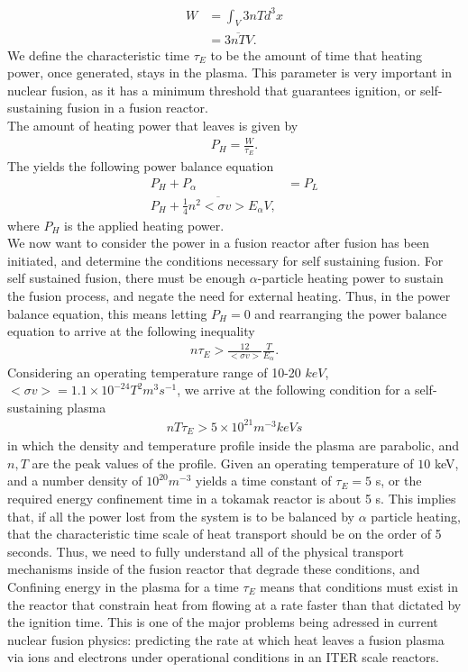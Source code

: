 \documentclass{article}
\begin{document}
\begin{align*}
W &= \int_{V}3nTd^3x\\
    &=3\overline{nT}V.
\end{align*}
We define the characteristic time $\tau_E$ to be the amount of time that heating power, once generated, stays in the plasma. This parameter is very important in nuclear fusion, as it has a minimum threshold that guarantees ignition, or self-sustaining fusion in a fusion reactor.\\ The amount of heating power that leaves is given by 
\begin{align*}
P_H = \frac{W}{\tau_E}.
\end{align*}
The yields the following power balance equation
\begin{align*}
P_H + P_{\alpha} &= P_L\\
P_H + \frac{1}{4}\overline{n^2 <\sigma v>}E_{\alpha} V,
\end{align*}
where $P_H$ is the applied heating power.\\
We now want to consider the power in a fusion reactor after fusion has been initiated, and determine the conditions necessary for self sustaining fusion. For self sustained fusion,  there must be enough $\alpha$-particle heating power to sustain the fusion process, and negate the need for external heating. Thus, in the power balance equation, this means letting $P_H =0$ and rearranging the power balance equation to arrive at the following inequality
\begin{align*}
n\tau_E > \frac{12}{<\sigma v>}\frac{T}{E_\alpha}. 
\end{align*}
Considering an operating temperature range of 10-20 $keV$, $<\sigma v> = 1.1 \times 10^{-24} T^2 m^3 s^{-1}$, we arrive at the following condition for a self-sustaining plasma
\begin{align*}
nT \tau_E > 5 \times 10^{21} m^{-3} keV s
\end{align*} 
in which the density and temperature profile inside the plasma are parabolic, and $n,T$ are the peak values of the profile. Given an operating temperature of $10$ keV, and a number density of $10^20 m^{-3}$ yields a time constant of $\tau_E =5$ s, or the required energy confinement time in a tokamak reactor is about 5 s. This implies that, if all the power lost from the system is to be balanced by $\alpha$ particle heating, that the characteristic time scale of heat transport should be on the order of 5 seconds. Thus, we need to fully understand all of the physical transport mechanisms inside of the fusion reactor that degrade these conditions, and \\
Confining energy in the plasma for a time $\tau_E$ means that conditions must exist in the reactor that constrain heat from flowing at a rate faster than that dictated by the ignition time. This is one of the major problems being adressed in current nuclear fusion physics: predicting the rate at which heat leaves a fusion plasma via ions and electrons under operational conditions in an ITER scale reactors.
\end{document}
